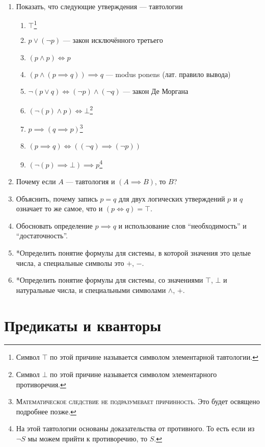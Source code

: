 \begin{enumerate}
	\item{}Показать, что следующие утверждения --- тавтологии
	\begin{enumerate}
		\item{}$\top$\footnote{Символ $\top$ по этой причине называется
			символом элементарной тавтологии.}
		\item{}$p\lor (\lnot p)$ --- закон исключённого третьего
		\item{}$(p\land p)\iff p$
		\item{}$(p\land (p\implies q))\implies q$ --- modus ponens (лат. правило вывода)
		\item{}$\lnot(p\lor q)\iff (\lnot p)\land (\lnot q)$ --- закон Де Моргана
		\item{}$(\lnot(p)\land p)\iff\bot$\footnote{Символ $\bot$ по этой причине называется
			символом элементарного противоречия.}
		\item{}$p\implies (q\implies p)$\footnote{
			\textsc{Математическое следствие не подразумевает причинность.}
			Это будет освящено подробнее позже.
		}
		\item{}${(p\implies q)\iff ((\lnot q)\implies (\lnot p))}$
		\item{}$(\lnot(p)\implies\bot)\implies p$\footnote{На этой тавтологии основаны
			доказательства от противного. То есть если из $\lnot S$ мы можем прийти
			к противоречию, то $S$.}
	\end{enumerate}
	\item{}Почему если $A$ --- тавтология и $(A\implies B)$, то $B$?
	\item{}Объяснить, почему запись $p=q$ для двух логических утверждений $p$ и $q$
	означает то же самое, что и $(p\iff q)=\top$.
	\item{}\label{ex:imply_def}Обосновать определение ${p\implies q}$ и использование
	слов ``необходимость'' и ``достаточность''.
	\item{}*Определить понятие формулы для системы, в которой значения это целые числа,
	а специальные символы это $+$, $-$.
	\item{}*Определить понятие формулы для системы, со значениями $\top$, $\bot$
	и натуральные числа, и специальными символами $\land$,  $+$.
\end{enumerate}

\section{Предикаты и кванторы}

